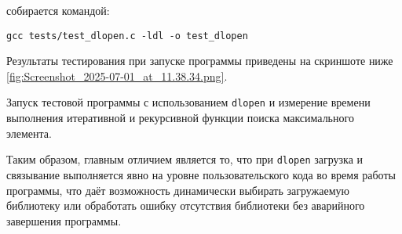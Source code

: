 \vspace{.3cm}

 собирается командой:
\begin{verbatim}
gcc tests/test_dlopen.c -ldl -o test_dlopen
\end{verbatim}

Результаты тестирования при запуске программы приведены на скриншоте ниже \ref{fig:Screenshot_2025-07-01_at_11.38.34.png}.

{Запуск тестовой программы с использованием \texttt{dlopen} и измерение времени выполнения итеративной и рекурсивной функции поиска максимального элемента.}

Таким образом, главным отличием является то, что при \texttt{dlopen} загрузка и связывание выполняется явно на уровне пользовательского кода во время работы программы, что даёт возможность динамически выбирать загружаемую библиотеку или обработать ошибку отсутствия библиотеки без аварийного завершения программы.